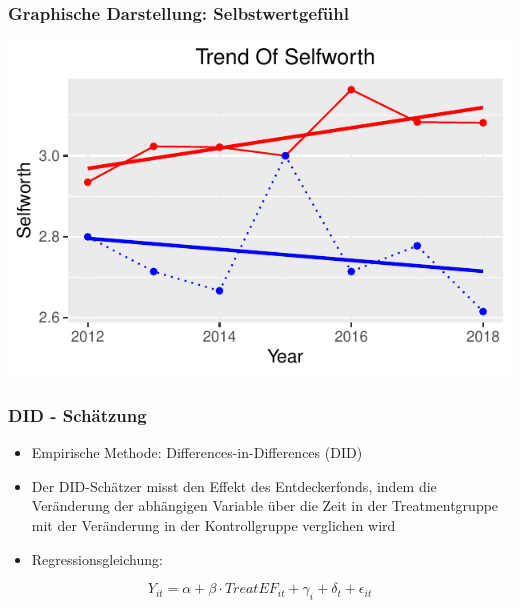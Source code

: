 \begin{frame}[fragile]
\begin{frame}[fragile]
\begin{frame}[fragile]
\begin{knitrout}
{}



\end{knitrout}
\end{frame}

\begin{frame}[fragile]
\frametitle{Graphische Darstellung: Selbstwertgefühl}
\begin{knitrout}\footnotesize
{}\color{fgcolor}

{\centering \includegraphics[width=\maxwidth]{figure/beamer-DIDSelfworthplot-1} 

}



\end{knitrout}
\end{frame}

\begin{frame}[fragile]
\frametitle{DID - Schätzung}
\begin{itemize}
\item Empirische Methode: Differences-in-Differences (DID)
\item Der DID-Schätzer misst den Effekt des Entdeckerfonds, indem die Veränderung der abhängigen Variable über die Zeit in der Treatmentgruppe mit der Veränderung in der Kontrollgruppe verglichen wird
\linebreak
\item Regressionsgleichung:
\end{itemize}

\begin{equation}
\label{DID equation}
  Y_{it} = \alpha + \beta \cdot TreatEF_{it} + \gamma_{i} + \delta_{t} + \epsilon_{it}
\end{equation}


\end{frame}
\end{frame}
\end{frame}
